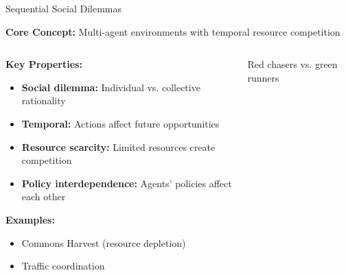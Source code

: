 \documentclass[aspectratio=169]{beamer}
\begin{document}
\begin{frame}{Sequential Social Dilemmas}
    
    \textbf{Core Concept:} Multi-agent environments with temporal resource competition \autocite{leibo_multi-agent_2017}
    
    \begin{columns}
        \begin{column}{0.6\textwidth}
            \textbf{Key Properties:}
            \begin{itemize}
                \item \textbf{Social dilemma:} Individual vs. collective rationality
                \item \textbf{Temporal:} Actions affect future opportunities
                \item \textbf{Resource scarcity:} Limited resources create competition
                \item \textbf{Policy interdependence:} Agents' policies affect each other
            \end{itemize}
            
            \textbf{Examples:}
            \begin{itemize}
                \item Commons Harvest (resource depletion)
                \item Traffic coordination
            \end{itemize}
        \end{column}
        \begin{column}{0.4\textwidth}
            \centering
            \small{Red chasers vs. green runners}
        \end{column}
    \end{columns}
\end{frame}
\end{document}
